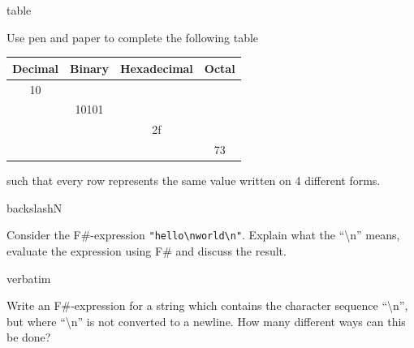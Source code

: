 \begin{defproblem}{table}
  \begin{onlyproblem}%
    Use pen and paper to complete the following table
    \begin{center}
      \begin{tabular}{|c|c|c|c|}
        \hline
        Decimal & Binary & Hexadecimal & Octal\\
        \hline
        10 &  &  & \\
        \hline
                & 10101 &  & \\
        \hline
                &  & 2f  & \\
        \hline
                &  &  & 73 \\
        \hline
      \end{tabular}
    \end{center}
    such that every row represents the same value written on 4 different forms.
  \end{onlyproblem}
\end{defproblem}

\begin{defproblem}{backslashN}
  \begin{onlyproblem}[fragile]%
    Consider the F\#-expression \lstinline{"hello\nworld\n"}. Explain what the ``\textbackslash n'' means, evaluate the expression using F\# and discuss the result.
  \end{onlyproblem}
\end{defproblem}

\begin{defproblem}{verbatim}
  \begin{onlyproblem}[fragile]%
    Write an F\#-expression for a string which contains the character sequence ``\textbackslash n'', but where ``\textbackslash n'' is not converted to a newline. How many different ways can this be done?
  \end{onlyproblem}
\end{defproblem}
